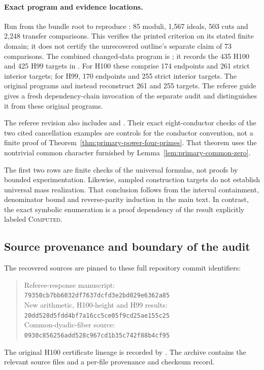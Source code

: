 \paragraph{Exact program and evidence locations.}
Run  from the bundle
root to reproduce : 85 moduli,
1,567 ideals, 503 cuts and 2,248 transfer comparisons. This verifies the
printed criterion on its stated finite domain; it does not certify the
unrecovered outline's separate claim of 73 comparisons.
The combined changed-data program is
; it records the 435 H100
and 425 H99 targets in .
For H100 these comprise 174 endpoints and 261 strict interior targets;
for H99, 170 endpoints and 255 strict interior targets. The original
programs  and
 instead reconstruct 261 and
255 targets. The referee guide gives a fresh dependency-chain invocation
of the separate audit and distinguishes it from these original programs.

The referee revision also includes
 and
.
Their exact eight-conductor checks of the two cited cancellation examples
are controls for the conductor convention, not a finite proof of
Theorem~\ref{thm:primary-power-four-primes}. That theorem uses the
nontrivial common character furnished by
Lemma~\ref{lem:primary-common-zero}.

The first two rows are finite checks of the universal formulas, not proofs
by bounded experimentation. Likewise, sampled construction targets do not
establish universal mass realization. That conclusion follows from the
interval containment, denominator bound and reverse-parity induction in
the main text. In contrast, the exact symbolic enumeration is a proof
dependency of the result explicitly labeled \textsc{Computed}.

\subsection{Source provenance and boundary of the audit}
The recovered sources are pinned to these full repository commit identifiers:
\begin{quote}\small
Referee-response manuscript:\\
\texttt{79350cb7bb6032df7637dcfd3e2bd029e6362a85}\\[.4em]
New arithmetic, H100-height and H99 results:\\
\texttt{20dd528d5fdd4bf7a16cc5ce05f9cd25ae155c25}\\[.4em]
Common-dyadic-fiber source:\\
\texttt{0930c856256add528c967cd1b35c742f88b4cf95}
\end{quote}
The original H100 certificate lineage is recorded by
\cite{ConstructionH100,ReviewPackageH100}. The archive contains the relevant
source files and a per-file provenance and checksum record.

